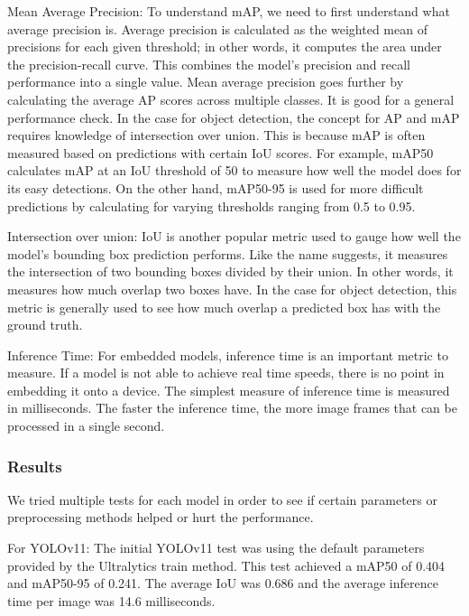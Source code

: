 \documentclass[stu,12pt,floatsintext]{apa7}
\begin{document}
Mean Average Precision: To understand mAP, we need to first understand what average precision is. Average precision is calculated as the weighted mean of precisions for each given threshold; in other words, it computes the area under the precision-recall curve. This combines the model's precision and recall performance into a single value. Mean average precision goes further by calculating the average AP scores across multiple classes. It is good for a general performance check. In the case for object detection, the concept for AP and mAP requires knowledge of intersection over union. This is because mAP is often measured based on predictions with certain IoU scores. For example, mAP50 calculates mAP at an IoU threshold of 50 to measure how well the model does for its easy detections. On the other hand, mAP50-95 is used for more difficult predictions by calculating for varying thresholds ranging from 0.5 to 0.95.

Intersection over union: IoU is another popular metric used to gauge how well the model's bounding box prediction performs. Like the name suggests, it measures the intersection of two bounding boxes divided by their union. In other words, it measures how much overlap two boxes have. In the case for object detection, this metric is generally used to see how much overlap a predicted box has with the ground truth.

Inference Time: For embedded models, inference time is an important metric to measure. If a model is not able to achieve real time speeds, there is no point in embedding it onto a device. The simplest measure of inference time is measured in milliseconds. The faster the inference time, the more image frames that can be processed in a single second.

\subsubsection{Results}

We tried multiple tests for each model in order to see if certain parameters or preprocessing methods helped or hurt the performance.

For YOLOv11:
The initial YOLOv11 test was using the default parameters provided by the Ultralytics train method. This test achieved a mAP50 of 0.404 and mAP50-95 of 0.241. The average IoU was 0.686 and the average inference time per image was 14.6 milliseconds.
\end{document}
